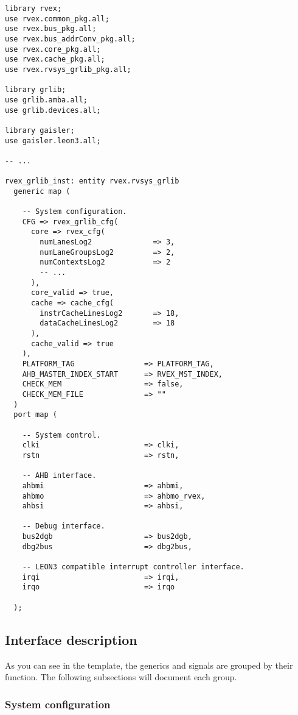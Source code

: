 \begin{lstlisting}[numbers=none]
library rvex;
use rvex.common_pkg.all;
use rvex.bus_pkg.all;
use rvex.bus_addrConv_pkg.all;
use rvex.core_pkg.all;
use rvex.cache_pkg.all;
use rvex.rvsys_grlib_pkg.all;

library grlib;
use grlib.amba.all;
use grlib.devices.all;

library gaisler;
use gaisler.leon3.all;

-- ...

rvex_grlib_inst: entity rvex.rvsys_grlib
  generic map (
    
    -- System configuration.
    CFG => rvex_grlib_cfg(
      core => rvex_cfg(
        numLanesLog2              => 3,
        numLaneGroupsLog2         => 2,
        numContextsLog2           => 2
        -- ...
      ),
      core_valid => true,
      cache => cache_cfg(
        instrCacheLinesLog2       => 18,
        dataCacheLinesLog2        => 18
      ),
      cache_valid => true
    ),
    PLATFORM_TAG                => PLATFORM_TAG,
    AHB_MASTER_INDEX_START      => RVEX_MST_INDEX,
    CHECK_MEM                   => false,
    CHECK_MEM_FILE              => ""
  )
  port map (
    
    -- System control.
    clki                        => clki,
    rstn                        => rstn,
    
    -- AHB interface.
    ahbmi                       => ahbmi,
    ahbmo                       => ahbmo_rvex,
    ahbsi                       => ahbsi,
    
    -- Debug interface.
    bus2dgb                     => bus2dgb,
    dbg2bus                     => dbg2bus,
    
    -- LEON3 compatible interrupt controller interface.
    irqi                        => irqi,
    irqo                        => irqo
    
  );

\end{lstlisting}

\subsection{Interface description}
\label{sec:rvsysgr-iface}

As you can see in the template, the generics and signals are grouped by their 
function. The following subsections will document each group.

\subsubsection{System configuration}
\label{sec:rvsysgr-iface-generics}

